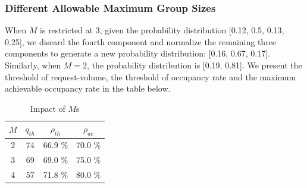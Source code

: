 



\subsubsection{Different Allowable Maximum Group Sizes}
When $M$ is restricted at 3, given the probability distribution [0.12, 0.5, 0.13, 0.25], we discard the fourth component and normalize the remaining three components to generate a new probability distribution: [0.16, 0.67, 0.17]. Similarly, when $M =2$, the probability distribution is [0.19, 0.81].
We present the threshold of request-volume, the threshold of occupancy rate and the maximum achievable occupancy rate in the table below.

\begin{table}[ht]
  \centering
  \caption{Impact of $M$s}
  \begin{tabular}{cccc}
  \hline
   $M$  & $q_{th}$ & $\rho_{th}$ & $\rho_{ac}$ \\
  \hline
   2 &  74  & 66.9 \% & 70.0 \% \\
   3 &  69  & 69.0 \% & 75.0 \% \\
   4 &  57  & 71.8 \% & 80.0 \% \\
   \hline
  \end{tabular}
\end{table}


